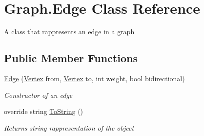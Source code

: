 \hypertarget{class_graph_1_1_edge}{}\section{Graph.\+Edge Class Reference}
\label{class_graph_1_1_edge}


A class that rappresents an edge in a graph  


\subsection*{Public Member Functions}
\begin{DoxyCompactItemize}
\item 
\hyperlink{class_graph_1_1_edge_ada1a26604e35b231a38ac5ed2f7bc92f}{Edge} (\hyperlink{class_graph_1_1_vertex}{Vertex} from, \hyperlink{class_graph_1_1_vertex}{Vertex} to, int weight, bool bidirectional)
\begin{DoxyCompactList}\small\item\em Constructor of an edge \end{DoxyCompactList}\item 
override string \hyperlink{class_graph_1_1_edge_a21f9dcb22638dd0e38356bc81b35e219}{To\+String} ()
\begin{DoxyCompactList}\small\item\em Returns string rappresentation of the object \end{DoxyCompactList}\end{DoxyCompactItemize}
